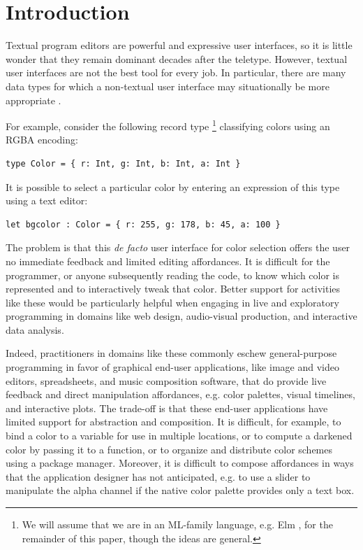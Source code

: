 \section{Introduction}\label{sec:intro}
Textual program editors are powerful and expressive user interfaces, 
so it is little wonder that they remain dominant decades after the teletype. 
However, textual user interfaces are not the best tool for every job. 
In particular, there are many 
data types for which a non-textual  
user interface may situationally be more appropriate \cite{Graphite}.

For example, consider the following record type%
\footnote{We will assume that we are in an ML-family language, 
e.g. Elm \cite{Elm,ElmArchitecture,czaplicki2012elm}, 
for the remainder of this paper, though the ideas are general.} 
classifying colors using an RGBA encoding:
\begin{lstlisting}[numbers=none]
type Color = { r: Int, g: Int, b: Int, a: Int }
\end{lstlisting}
It is possible to select a particular color by entering  
an expression of this type using a text editor:
\begin{lstlisting}[numbers=none]
let bgcolor : Color = { r: 255, g: 178, b: 45, a: 100 }
\end{lstlisting}
The problem is that this \emph{de facto} user interface for color selection 
offers the user no immediate feedback 
and limited editing affordances.
It is difficult for the programmer, or anyone subsequently reading the code, to know which color is represented 
and to interactively tweak that color. 
Better support for activities like these would be particularly helpful when engaging in 
live and exploratory programming in domains like web design, audio-visual production, 
and interactive data analysis.

Indeed, practitioners in domains like these commonly eschew general-purpose programming 
in favor of graphical end-user applications, like %
image and video editors, spreadsheets, and music composition software, 
that do provide live feedback and 
direct manipulation affordances, e.g. color palettes, visual timelines, and interactive plots. 
The trade-off is that these end-user applications have limited support for abstraction and composition. 
It is difficult, for example, to bind a
color to a variable for use in multiple locations, 
or to compute a darkened color by passing it to a function, 
or to organize and distribute color schemes using a package manager.
Moreover, it is difficult to compose affordances in ways that the application designer has not 
anticipated, 
e.g. to use a slider to manipulate the alpha channel 
if the native color palette provides only a text box.

